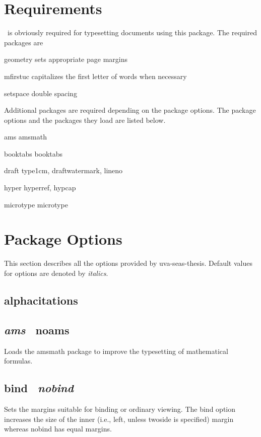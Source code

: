 \documentclass[10pt]{article}
\newcommand{\package}[1]{#1}
\newcommand{\option}[1]{#1}
\newcommand{\default}[1]{\emph{#1}}
\newcommand{\thispackage}{\package{uva-seas-thesis}}
\begin{document}
\section{Requirements}\label{section:requirements}
\LaTeXe\ is obviously required for typesetting documents using this package.
The required packages are
\begin{description*}
  \item[\package{geometry}] sets appropriate page margins
  \item[\package{mfirstuc}] capitalizes the first letter of words when necessary
  \item[\package{setspace}] double spacing
\end{description*}
Additional packages are required depending on the package options.
The package options and the packages they load are listed below.
\begin{description*}
  \item[\option{ams}] \package{amsmath}
  \item[\option{booktabs}] \package{booktabs}
  \item[\option{draft}] \package{type1cm}, \package{draftwatermark}, \package{lineno}
  \item[\option{hyper}] \package{hyperref}, \package{hypcap}
  \item[\option{microtype}] \package{microtype}
\end{description*}

\section{Package Options}\label{section:options}
This section describes all the options provided by \thispackage.
Default values for options are denoted by \default{italics}.

\subsection{\option{alphacitations}}


\subsection{\default{\option{ams}} \textbar\ \option{noams}}
Loads the \package{amsmath} package to improve the typesetting of mathematical formulas.

\subsection{\option{bind} \textbar\ \default{\option{nobind}}}
Sets the margins suitable for binding or ordinary viewing.
The bind option increases the size of the inner (i.e., left, unless \option{twoside} is specified) margin whereas nobind has equal margins.
\end{document}
